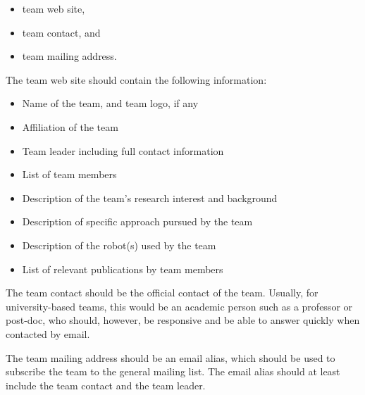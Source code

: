 \begin{itemize}
	\item team web site,
	\item team contact, and
	\item team mailing address.
\end{itemize}

The team web site should contain the following information:

\begin{itemize}
	\item Name of the team, and team logo, if any
	\item Affiliation of the team
	\item Team leader including full contact information
	\item List of team members
	\item Description of the team's research interest and background
	\item Description of specific approach pursued by the team
	\item Description of the robot(s) used by the team
	\item List of relevant publications by team members

\end{itemize}

The team contact should be the official contact of the team. Usually, for university-based teams, this would be an academic person such as a professor or post-doc, who should, however, be responsive and be able to answer quickly when contacted by email.
\par
The team mailing address should be an email alias, which should be used to subscribe the team to the general \RCAW mailing list. The email alias should at least include the team contact and the team leader.
